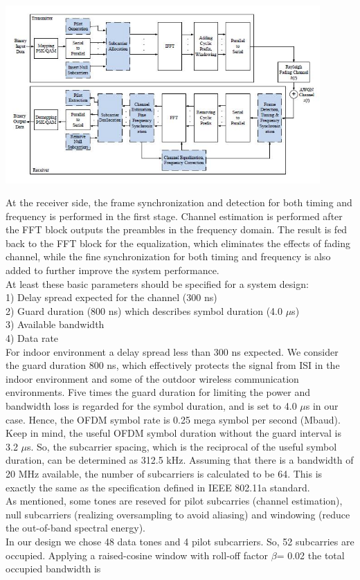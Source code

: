 \begin{center}
\includegraphics[width=12cm]{content/fig/ieee_system_design.JPG}
\end{center}

At the receiver side, the frame synchronization and detection for both timing and frequency is performed in the first stage. Channel estimation is performed after the FFT block outputs the preambles in the frequency domain. The result is fed back to the FFT block for the equalization, which eliminates the effects of fading channel, while the fine synchronization for both timing and frequency is also added to further improve the system performance.\\
At least these basic parameters should be specified for a system design:\\
1) Delay spread expected for the channel (300 ns)\\
2) Guard duration (800 ns) which describes symbol duration (4.0 $\mu$s)\\
3) Available bandwidth\\
4) Data rate\\

For indoor environment a delay spread less than 300 ns expected. We consider the guard duration 800 ns, which effectively protects the signal from ISI in the indoor environment and some of the outdoor wireless communication environments. Five times the guard duration for limiting the power and bandwidth loss is regarded for the symbol duration, and is set to 4.0 $\mu$s in our case. Hence, the OFDM symbol rate is 0.25 mega symbol per second (Mbaud).\\
Keep in mind, the useful OFDM symbol duration without the guard interval is 3.2 $\mu$s. So, the subcarrier spacing, which is the reciprocal of the useful symbol duration, can be determined as 312.5 kHz. Assuming that there is a bandwidth of 20 MHz available, the number of subcarriers is calculated to be 64. This is exactly the same as the specification defined in IEEE 802.11a standard.\\
As mentioned, some tones are reseved for pilot subcarries (channel estimation), null subcarriers (realizing oversampling to avoid aliasing) and windowing (reduce the out-of-band spectral energy).\\
In our design we chose 48 data tones and 4 pilot subcarriers. So, 52 subcarries are occupied. Applying a raised-cosine window with roll-off factor $\beta$= 0.02 the total occupied bandwidth is\\

